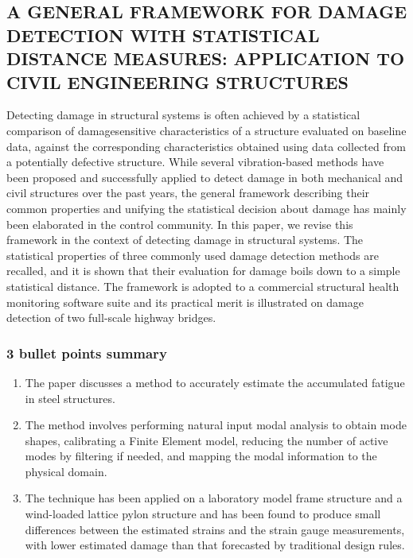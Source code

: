 \documentclass[
  letterpaper,
  DIV=11,
  numbers=noendperiod]{scrreprt}
\providecommand{\tightlist}{%
  \setlength{\itemsep}{0pt}\setlength{\parskip}{0pt}}\usepackage{longtable,booktabs,array}
\begin{document}
\hypertarget{a-general-framework-for-damage-detection-with-statistical-distance-measures-application-to-civil-engineering-structures}{%
\subsection{A GENERAL FRAMEWORK FOR DAMAGE DETECTION WITH STATISTICAL
DISTANCE MEASURES: APPLICATION TO CIVIL ENGINEERING
STRUCTURES}\label{a-general-framework-for-damage-detection-with-statistical-distance-measures-application-to-civil-engineering-structures}}

Detecting damage in structural systems is often achieved by a
statistical comparison of damagesensitive characteristics of a structure
evaluated on baseline data, against the corresponding characteristics
obtained using data collected from a potentially defective structure.
While several vibration-based methods have been proposed and
successfully applied to detect damage in both mechanical and civil
structures over the past years, the general framework describing their
common properties and unifying the statistical decision about damage has
mainly been elaborated in the control community. In this paper, we
revise this framework in the context of detecting damage in structural
systems. The statistical properties of three commonly used damage
detection methods are recalled, and it is shown that their evaluation
for damage boils down to a simple statistical distance. The framework is
adopted to a commercial structural health monitoring software suite and
its practical merit is illustrated on damage detection of two full-scale
highway bridges.

\hypertarget{bullet-points-summary-17}{%
\subsubsection{3 bullet points summary}\label{bullet-points-summary-17}}

\begin{enumerate}
\def\labelenumi{\arabic{enumi}.}
\tightlist
\item
  The paper discusses a method to accurately estimate the accumulated
  fatigue in steel structures.
\item
  The method involves performing natural input modal analysis to obtain
  mode shapes, calibrating a Finite Element model, reducing the number
  of active modes by filtering if needed, and mapping the modal
  information to the physical domain.
\item
  The technique has been applied on a laboratory model frame structure
  and a wind-loaded lattice pylon structure and has been found to
  produce small differences between the estimated strains and the strain
  gauge measurements, with lower estimated damage than that forecasted
  by traditional design rules.
\end{enumerate}
\end{document}
